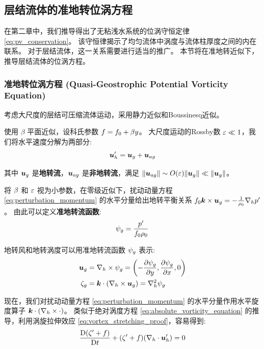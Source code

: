 \subsection{层结流体的准地转位涡方程}

在第二章中，我们推导得出了无粘浅水系统的位涡守恒定律 \eqref{eq:pv_conservation}。
该守恒律揭示了均匀流体中涡度与流体柱厚度之间的内在联系。
对于层结流体，这一关系需要进行适当的推广。
本节将在准地转近似下，推导层结流体的位涡方程。

\subsubsection{准地转位涡方程 (Quasi-Geostrophic Potential Vorticity Equation)}

考虑大尺度的层结可压缩流体运动，采用静力近似和Boussinesq近似。

使用 $\beta$ 平面近似，设科氏参数 $f = f_0 + \beta y$。
大尺度运动的Rossby数 $\varepsilon \ll 1$，我们将水平速度分解为两部分:
\begin{equation*}
    \bm{u}_h^\prime = \bm{u}_g + \bm{u}_{ag}
\end{equation*}

其中 $\bm{u}_g$ 是\textbf{地转流}，$\bm{u}_{ag}$ 是\textbf{非地转流}，满足 $\lVert \bm{u}_{ag} \rVert \sim O(\varepsilon) \lVert \bm{u}_g \rVert \ll \lVert \bm{u}_g \rVert$。

将 $\beta$ 和 $\varepsilon$ 视为小参数，在零级近似下，扰动动量方程 \eqref{eq:perturbation_momentum} 的水平分量给出地转平衡关系 $f_0 \bm{k} \times \bm{u}_g = -\frac{1}{\rho_0} \nabla_h p^\prime$。
由此可以定义\textbf{准地转流函数}:
\begin{equation}
    \psi_g = \frac{p^\prime}{f_0 \rho_0}
    \label{eq:qg_streamfunction}
\end{equation}

地转风和地转涡度可以用准地转流函数 $\psi_g$ 表示:
\begin{align*}
    \vel_g &= \nabla_h \times \streamfunc_g = \left(-\pde{\streamfunc_g}{y}, \pde{\streamfunc_g}{x}, 0\right) \\
    \relvort_g &= \kvec \cdot (\nabla_h \times \vel_g) = \nabla_h^2 \streamfunc_g
\end{align*}

现在，我们对扰动动量方程 \eqref{eq:perturbation_momentum} 的水平分量作用水平旋度算子 $\bm{k} \cdot (\nabla_h \times \cdot)$。
类似于绝对涡度方程 \eqref{eq:absolute_vorticity_equation} 的推导，利用涡旋拉伸效应 \eqref{eq:vortex_stretching_proof}，容易得到:
\begin{equation*}
    \frac{\mathrm{D} (\zeta^\prime + f)}{\mathrm{D} t} + (\zeta^\prime + f) (\nabla_h \cdot \bm{u}_h^\prime) = 0
\end{equation*}

